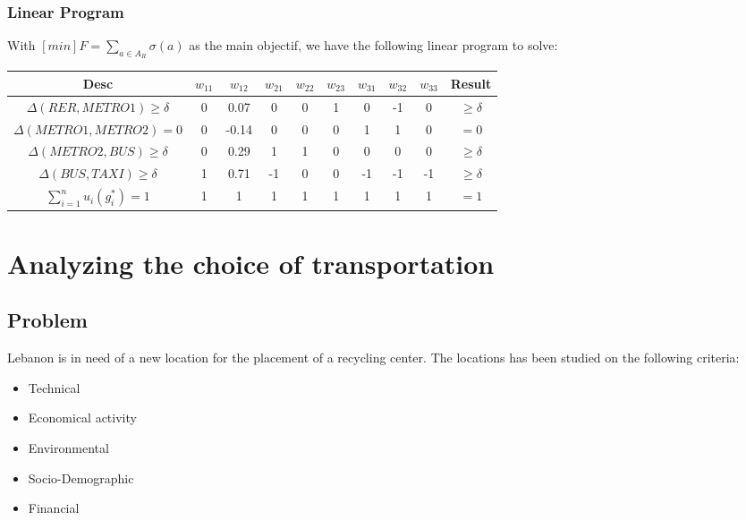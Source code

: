 \documentclass{report}
\begin{document}
\subsubsection{Linear Program}
With $[min]F = \sum_{a \in A_R} \sigma(a) $ as the main objectif, we have the following linear program to solve: 
 
\begin{center}
\begin{tabular}{ |c|c|c|c|c|c|c|c|c|c| } 
\hline Desc & $w_{11}$ & $w_{12}$ & $w_{21}$ & $w_{22}$  & $w_{23}$ & $w_{31}$ & $w_{32}$ & $w_{33}$ & Result  \\ \hline
$\Delta (RER, METRO1)\geq \delta$     & 0 & 0.07  & 0  & 0 & 1 & 0  & -1 & 0 & $\geq \delta$\\
$\Delta (METRO1, METRO2) = 0$         & 0 & -0.14 & 0  & 0 & 0 & 1  & 1  & 0 & $= 0$\\
$\Delta (METRO2, BUS)\geq \delta$     & 0 & 0.29  & 1  & 1 & 0 & 0  & 0   & 0 & $\geq \delta$\\
$\Delta (BUS, TAXI) \geq \delta$          & 1 & 0.71  & -1 & 0 & 0 & -1 & -1 & -1 & $\geq \delta$\\
$\sum_{i=1}^{n} u_i(g_{i}^{*}) = 1$ & 1 & 1       & 1   & 1 & 1 & 1  & 1  & 1 & $= 1$ \\
\hline
\end{tabular}
\end{center}

\section{Analyzing the choice of transportation}
\subsection{Problem}
Lebanon is in need of a new location for the placement of a recycling center. The locations has been studied on the following criteria: 
\begin{itemize}
\item Technical
\item Economical activity  
\item Environmental
\item Socio-Demographic
\item Financial
\end{itemize}
\end{document}
